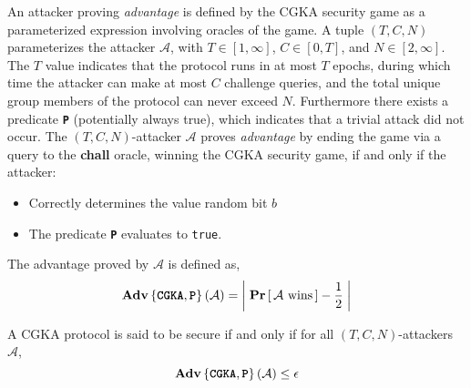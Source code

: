 An attacker proving \emph{advantage} is defined by the CGKA security game as a parameterized expression involving oracles of the game.
A tuple \((T, C, N)\) parameterizes the attacker \(\mathcal{A}\), with \(T \in \left[1, \infty \right]\), \(C \in \left[0, T \right]\), and \(N \in \left[2, \infty \right]\).
The \(T\) value indicates that the protocol runs in at most \(T\) epochs, during which time the attacker can make at most \(C\) challenge queries, and the total unique group members of the protocol can never exceed \(N\).
Furthermore there exists a predicate \textbf{\texttt{P}} (potentially always true), which indicates that a trivial attack did not occur.
The \((T, C, N)\)-attacker \(\mathcal{A}\) proves \emph{advantage} by ending the game via a query to the \textbf{chall} oracle, winning the CGKA security game, if and only if the attacker:

\begin{itemize}
\item
  Correctly determines the value random bit \(b\)
\item
  The predicate \textbf{\texttt{P}} evaluates to \texttt{true}.
\end{itemize}

\begin{definition}
The advantage proved by $\mathcal{A}$ is defined as,
$$ \normalfont{\textbf{Adv}}\left\{\textbf{\texttt{CGKA}},\textbf{\texttt{P}}\right\}(\mathcal{A})  = \left|\; \textbf{Pr}\left[ \,\mathcal{A}\text{ wins}\, \right] - \frac{1}{2} \;\right| $$
\end{definition}

\begin{definition}  
\label{def:CGKA-Security}
A CGKA protocol is said to be secure if and only if for all $(T, C, N)$-attackers $\mathcal{A}$,
$$ \normalfont\textbf{Adv}\left\{\textbf{\texttt{CGKA}},\textbf{\texttt{P}}\right\}(\mathcal{A}) \leq \epsilon $$
\end{definition}

